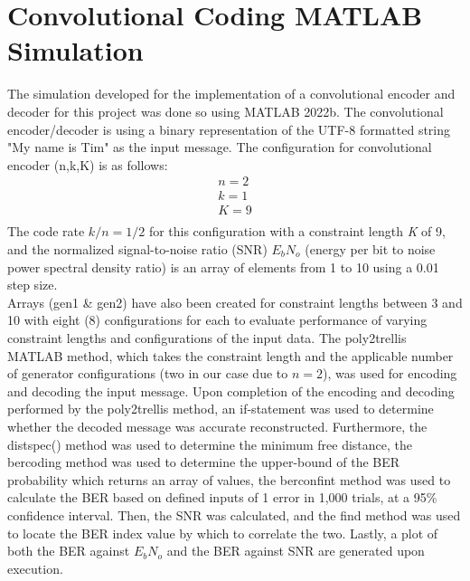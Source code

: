 \documentclass[conference]{IEEEtran}
\begin{document}
\section{Convolutional Coding MATLAB Simulation}
The simulation developed for the implementation of a convolutional encoder and decoder for this project was done so using MATLAB 2022b. The convolutional encoder/decoder is using a binary representation of the UTF-8 formatted string "My name is Tim" as the input message. The configuration for convolutional encoder (n,k,K) is as follows:\\
\begin{align*}
    n = 2\\
    k = 1\\
    K = 9\\
\end{align*}
The code rate $k/n = 1/2$ for this configuration with a constraint length \textit{K} of 9, and the normalized signal-to-noise ratio (SNR) $E_b N_o$ (energy per bit to noise power spectral density ratio) is an array of elements from 1 to 10 using a 0.01 step size.\\

Arrays (gen1 \& gen2) have also been created for constraint lengths between 3 and 10  with eight (8) configurations for each to evaluate performance of varying constraint lengths and configurations of the input data. The poly2trellis MATLAB method, which takes the constraint length and the applicable number of generator configurations (two in our case due to $n=2$), was used for encoding and decoding the input message. Upon completion of the encoding and decoding performed by the poly2trellis method, an if-statement was used to determine whether the decoded message was accurate reconstructed. Furthermore, the distspec() method was used to determine the minimum free distance, the bercoding method was used to determine the upper-bound of the BER probability which returns an array of values, the berconfint method was used to calculate the BER based on defined inputs of 1 error in 1,000 trials, at a 95\% confidence interval. Then, the SNR was calculated, and the find method was used to locate the BER index value by which to correlate the two. Lastly, a plot of both the BER against $E_b N_o$ and the BER against SNR are generated upon execution. 
\end{document}
